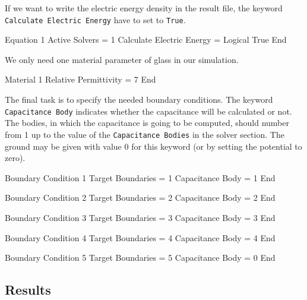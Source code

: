 \begin{flushleft}
If we want to write the electric energy density in the result file, the keyword {\tt Calculate Electric Energy} have to set to {\tt True}.      

\ttbegin                                                           
Equation 1
  Active Solvers =  1
  Calculate Electric Energy = Logical True
End
\ttend

We only need one material parameter of glass in our simulation.

\ttbegin               
Material 1
  Relative Permittivity = 7
End
\ttend

The final task is to specify the needed boundary conditions.
The keyword {\tt Capacitance Body} indicates whether the capacitance will be calculated or not.
The bodies, in which the capacitance is going to be computed, should number from 1 up to the value of the
{\tt Capacitance Bodies} in the solver section.
The ground may be given with value 0 for this keyword (or by setting the potential to zero).  

\ttbegin
Boundary Condition 1
  Target Boundaries = 1
  Capacitance Body = 1
End

Boundary Condition 2
  Target Boundaries = 2
  Capacitance Body = 2
End

Boundary Condition 3
  Target Boundaries = 3
  Capacitance Body = 3
End

Boundary Condition 4
  Target Boundaries = 4
  Capacitance Body = 4
End

Boundary Condition 5
  Target Boundaries = 5
  Capacitance Body = 0
End
\ttend

\end{flushleft}


\subsection*{Results}

